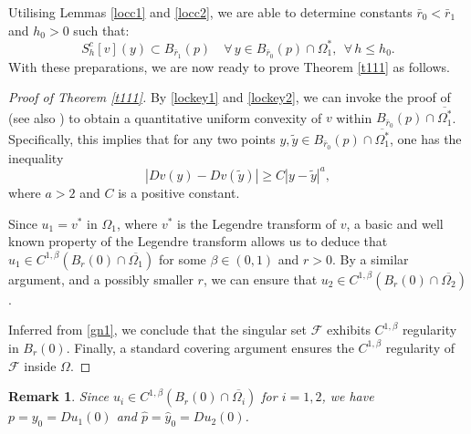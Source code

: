 \documentclass[10pt,a4paper]{amsart}
\theoremstyle{plain}
\newtheorem{remark}{Remark}[section]
\newcommand{\0}{\textbf{0}}
\numberwithin{equation}{section}
\numberwithin{equation}{section}
\numberwithin{figure}{section}
\begin{document}
Utilising Lemmas \ref{locc1} and \ref{locc2}, we are able to determine constants \( \bar r_0 < \bar r_1 \) and \( h_0 > 0 \) such that:
\begin{equation}\label{lockey2}
S_h^c[v](y) \subset B_{\bar r_1}(p)  \quad \forall\, y \in B_{\bar r_0}(p) \cap \Omega_1^*, \ \  \forall\, h \leq h_0.
\end{equation}
With these preparations, we are now ready to prove Theorem \ref{t111} as follows.
\begin{proof}[Proof of Theorem \ref{t111}]
By \eqref{lockey1} and \eqref{lockey2}, we can invoke the proof of \cite[Lemma 2.2, Corollary 2.3]{C96} (see also \cite[Theorem 7.13]{CM}) to obtain a quantitative uniform convexity of $v$ within $B_{\bar{r}_0}(p)\cap \overline{\Omega_1^*}$. Specifically, this implies that for any two points $y, \tilde{y} \in B_{\bar{r}_0}(p) \cap \overline{\Omega_1^*}$, one has the inequality 
	$$ |Dv(y) - Dv(\tilde{y})| \geq C|y - \tilde{y}|^a,$$ 
where $a > 2$ and $C$ is a positive constant.

Since $u_1 = v^*$ in $\Omega_1$, where $v^*$ is the Legendre transform of $v$, a basic and well known property of the Legendre transform \cite[Remark 7.10]{CM} allows us to deduce that $u_1 \in C^{1,\beta}(B_r(0) \cap \overline{\Omega_1})$ for some $\beta \in (0, 1)$ and $r > 0$. 
By a similar argument, and a possibly smaller $r$, we can ensure that $u_2 \in C^{1,\beta}(B_r(0) \cap \overline{\Omega_2})$.

Inferred from \eqref{gn1}, we conclude that the singular set $\mathcal{F}$ exhibits $C^{1,\beta}$ regularity in $B_r(0)$. Finally, a standard covering argument ensures the $C^{1,\beta}$ regularity of $\mathcal{F}$ inside $\Omega$.
\end{proof}

\begin{remark}
\emph{
Since \( u_i \in C^{1,\beta}(B_r(0) \cap \overline{\Omega_i}) \) for \( i = 1, 2 \), we have \( p = y_0 = Du_1(0) \) and \( \hat{p} = \hat{y}_0 = Du_2(0)\).
}
\end{remark}
\end{document}
